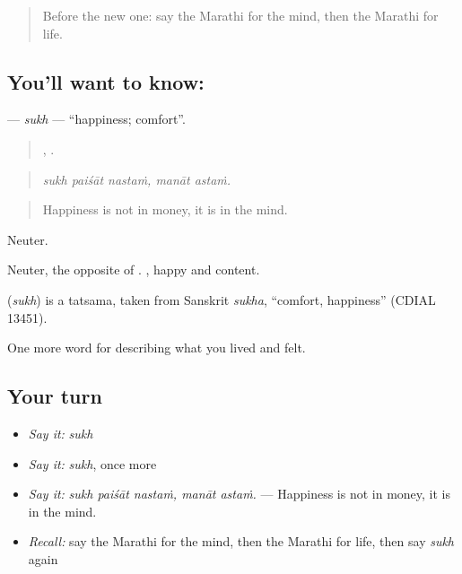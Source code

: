 \label{lesson:MR-C450-sukh}



\begin{quote}
Before the new one: say the Marathi for the mind, then the Marathi for life.
\end{quote}

\subsection*{You'll want to know: }
\textbf{} — \emph{sukh} — \textquotedblleft{}happiness; comfort\textquotedblright{}.

\begin{quote}
  ,  .
\end{quote}

\begin{quote}
\emph{sukh paiśāt nastaṁ, manāt astaṁ.}
\end{quote}

\begin{quote}
Happiness is not in money, it is in the mind.
\end{quote}

Neuter.

Neuter, the opposite of . , happy and content.

\begin{cousinweb}
\textbf{} (\emph{sukh}) is a tatsama, taken from Sanskrit \emph{sukha}, \textquotedblleft{}comfort, happiness\textquotedblright{} (CDIAL 13451).
\end{cousinweb}

\begin{grammarlens}[title={What you've built}]
One more word for describing what you lived and felt.
\end{grammarlens}

\subsection*{Your turn}
\begin{itemize}
\raggedright
  \item \emph{Say it:} \emph{sukh}
  \item \emph{Say it:} \emph{sukh}, once more
  \item \emph{Say it:} \emph{sukh paiśāt nastaṁ, manāt astaṁ.} — Happiness is not in money, it is in the mind.
  \item \emph{Recall:} say the Marathi for the mind, then the Marathi for life, then say \emph{sukh} again
\end{itemize}

